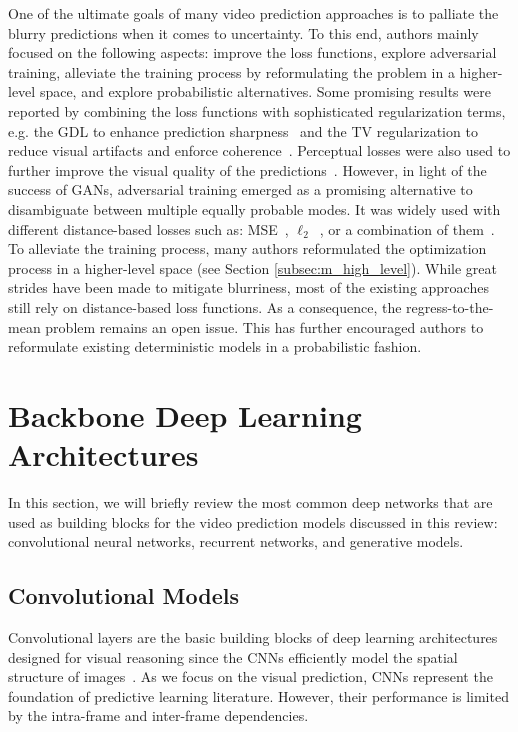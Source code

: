 One of the ultimate goals of many video prediction approaches is to palliate the blurry predictions when it comes to uncertainty. To this end, authors mainly focused on the following aspects: improve the loss functions, explore adversarial training, alleviate the training process by reformulating the problem in a higher-level space, and explore probabilistic alternatives. Some promising results were reported by combining the loss functions with sophisticated regularization terms, e.g. the \ac{GDL} to enhance prediction sharpness~\cite{Mathieu2016} and the \ac{TV} regularization to reduce visual artifacts and enforce coherence~\cite{Liu2017}. Perceptual losses were also used to further improve the visual quality of the predictions~\cite{Dosovitskiy2016,Johnson2016,Ledig2017,Sajjadi2017,Zhu2016}. However, in light of the success of \acp{GAN}, adversarial training emerged as a promising alternative to disambiguate between multiple equally probable modes. It was widely used with different distance-based losses such as: \ac{MSE}~\cite{Lotter2015}, $\ell_2$~\cite{Chen2017,Jin2017,Wichers2018}, or a combination of them~\cite{Mathieu2016,Villegas2017,Walker2017,Liang2017,Luc2017,Hu2019}. To alleviate the training process, many authors reformulated the optimization process in a higher-level space (see Section \ref{subsec:m_high_level}). While great strides have been made to mitigate blurriness, most of the existing approaches still rely on distance-based loss functions. As a consequence, the regress-to-the-mean problem remains an open issue. This has further encouraged authors to reformulate existing deterministic models in a probabilistic fashion.

\section{Backbone Deep Learning Architectures}
\label{cha:videoprediction:sec:background}
In this section, we will briefly review the most common deep networks that are used as building blocks for the video prediction models discussed in this review: convolutional neural networks, recurrent networks, and generative models.

\subsection{Convolutional Models}
Convolutional layers are the basic building blocks of deep learning architectures designed for visual reasoning since the \acp{CNN} efficiently model the spatial structure of images~\cite{Lecun1998}. As we focus on the visual prediction, \acp{CNN} represent the foundation of predictive learning literature. However, their performance is limited by the intra-frame and inter-frame dependencies.

